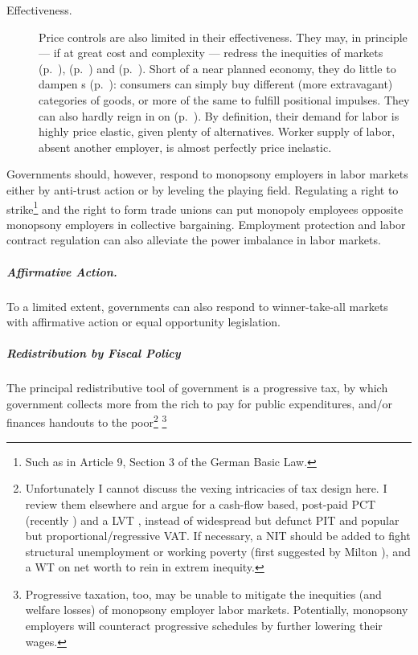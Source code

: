 \begin{description}
	\item[Effectiveness.]
		Price controls are also limited in their effectiveness. They may, in principle --- if at great cost and complexity --- redress the inequities of  markets (p.~\pageref{sec:winne-take-all}),  (p.~\pageref{sec:differentbudgetconstraints}) and  (p.~\pageref{sec:diminishingmarginalutility}). Short of a near planned economy, they do little to dampen s (p.~\pageref{sec:positionalrace}):  consumers can simply buy different (more extravagant) categories of goods, or more of the same to fulfill positional impulses. They can also hardly reign in on  (p.~\pageref{sec:monopsonyemployers}). By definition, their demand for labor is highly price elastic, given plenty of alternatives. Worker supply of labor, absent another employer, is almost perfectly price inelastic.
\end{description}

Governments should, however, respond to monopsony employers in labor markets either by anti-trust action or by leveling the playing field. Regulating a right to strike\footnote{Such as in Article 9, Section 3 of the German Basic Law.} and the right to form trade unions can put monopoly employees opposite monopsony employers in collective bargaining. Employment protection and labor contract regulation can also alleviate the power imbalance in labor markets.

\subparagraph{Affirmative Action.}  \label{sec:affirmativeaction} To a limited extent, governments can also respond to winner-take-all markets with affirmative action or equal opportunity legislation.

\subparagraph{Redistribution by Fiscal Policy}  \label{sec:fiscalredistribution} The principal redistributive tool of government is a progressive tax, by which government collects more from the rich to pay for public expenditures, and/or finances handouts to the poor\footnote{
	Unfortunately I cannot discuss the vexing intricacies of tax design here. I review them elsewhere \citep{Held2010a} and argue for a cash-flow based, post-paid \gls{PCT} (recently \citealt{McCaffery2002,McCaffery2005}) and a \gls{LVT} \citep{George1879}, instead of widespread but defunct \gls{PIT} and popular but proportional/regressive \gls{VAT}. If necessary, a \gls{NIT} should be added to fight structural unemployment or working poverty (first suggested by Milton \citealt{Friedman1962}), and a \gls{WT} on net worth to rein in extrem inequity.}
	\footnote{
	Progressive taxation, too, may be unable to mitigate the inequities (and welfare losses) of monopsony employer labor markets. Potentially, monopsony employers will counteract progressive schedules by further lowering their wages.}


